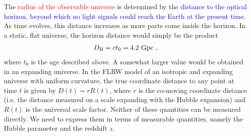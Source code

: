 \documentclass[12pt,a4paper]{article}
\begin{document}
\cite{perkins2008particle} The \textcolor{red}{radius of the observable universe} is determined by the \textcolor{blue}{distance to the optical horizon}, \textcolor{blue}{beyond which no light signals could reach the Earth at the present time}. As time evolves, this distance increases as more parts come inside the horizon. In a static, flat universe, the horizon distance would simply be the product
\begin{equation}
D_{\rm H} = ct_0 = 4.2 ~{\rm Gpc} ~,
\end{equation}
where $t_0$ is the age described above. A somewhat larger value would be obtained in an expanding universe. In the FLRW model of an isotropic and expanding universe with uniform curvature, the true coordinate distance to any point at time $t$ is given by $D(t) = rR(t)$, where $r$ is the co-moving coordinate distance (i.e. the distance measured on a scale expanding with the Hubble expansion) and $R(t)$ is the universal scale factor. Neither of these quantities can be measured directly. We need to express them in terms of measurable quantities, namely the Hubble parameter and the redshift $z$.
\end{document}
